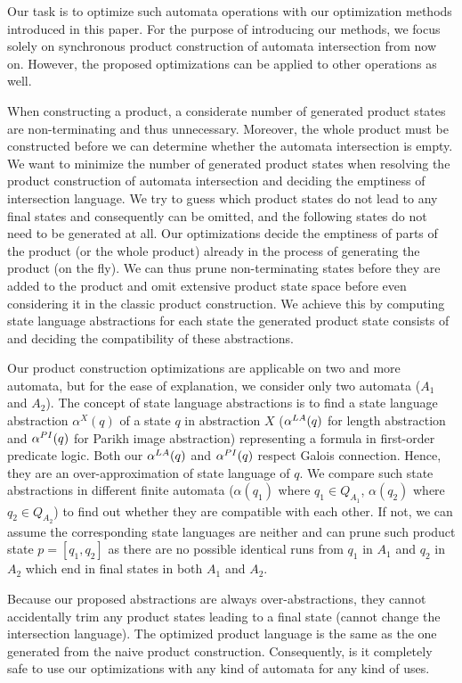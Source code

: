 Our task is to optimize such automata operations with our optimization methods introduced in this paper. For the purpose of introducing our methods, we focus solely on synchronous product construction of automata intersection from now on. However, the proposed optimizations can be applied to other operations as well.

When constructing a product, a considerate number of generated product states are non-terminating and thus unnecessary. Moreover, the whole product must be constructed before we can determine whether the automata intersection is empty. We want to minimize the number of generated product states when resolving the product construction of automata intersection and deciding the emptiness of intersection language. We try to guess which product states do not lead to any final states and consequently can be omitted, and the following states do not need to be generated at all. Our optimizations decide the emptiness of parts of the product (or the whole product) already in the process of generating the product (on the fly). We can thus prune non-terminating states before they are added to the product and omit extensive product state space before even considering it in the classic product construction. We achieve this by computing state language abstractions for each state the generated product state consists of and deciding the compatibility of these abstractions.

Our product construction optimizations are applicable on two and more automata, but for the ease of explanation, we consider only two automata ($A_1$ and $A_2$). The concept of state language abstractions is to find a state language abstraction $\alpha^X(q)$ of a state $q$ in abstraction $X$ ($\alpha^{LA}(q)$ for length abstraction and $\alpha^{PI}(q)$ for Parikh image abstraction) representing a formula in first-order predicate logic. Both our $\alpha^{LA}(q)$ and $\alpha^{PI}(q)$ respect Galois connection. Hence, they are an over-approximation of state language of $q$. We compare such state abstractions in different finite automata ($\alpha(q_1)$ where $q_1 \in Q_{A_1}$, $\alpha(q_2)$ where $q_2 \in Q_{A_2}$) to find out whether they are compatible with each other. If not, we can assume the corresponding state languages are neither and can prune such product state $p = [q_1, q_2]$ as there are no possible identical runs from $q_1$ in $A_1$ and $q_2$ in $A_2$ which end in final states in both $A_1$ and $A_2$.

Because our proposed abstractions are always over-abstractions, they cannot accidentally trim any product states leading to a final state (cannot change the intersection language). The optimized product language is the same as the one generated from the naive product construction. Consequently, is it completely safe to use our optimizations with any kind of automata for any kind of uses.

